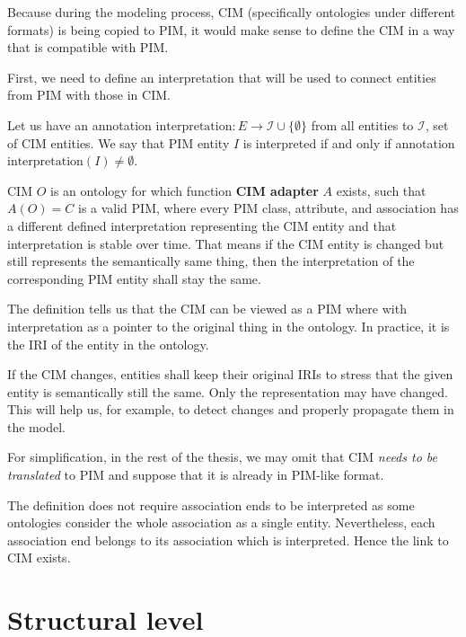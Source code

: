 Because during the modeling process, CIM (specifically ontologies under different formats) is being copied to PIM, it would make sense to define the CIM in a way that is compatible with PIM.

First, we need to define an interpretation that will be used to connect entities from PIM with those in CIM.

\begin{definition}[interpretation]
    Let us have an annotation $\textrm{interpretation}: E \rightarrow \mathcal{I} \cup \{\emptyset\}$ from all entities to $\mathcal{I}$, set of CIM entities. We say that PIM entity $I$ is interpreted if and only if annotation $\textrm{interpretation}(I) \neq \emptyset$.
\end{definition}

\begin{definition}[CIM]
    CIM $O$ is an ontology for which function \textbf{CIM adapter} $A$ exists, such that $A(O) = C$ is a valid PIM, where every PIM class, attribute, and association has a different defined interpretation representing the CIM entity and that interpretation is stable over time. That means if the CIM entity is changed but still represents the semantically same thing, then the interpretation of the corresponding PIM entity shall stay the same.
\end{definition}

The definition tells us that the CIM can be viewed as a PIM where with interpretation as a pointer to the original thing in the ontology. In practice, it is the IRI of the entity in the ontology.

If the CIM changes, entities shall keep their original IRIs to stress that the given entity is semantically still the same. Only the representation may have changed. This will help us, for example, to detect changes and properly propagate them in the model.

For simplification, in the rest of the thesis, we may omit that CIM \textit{needs to be translated} to PIM and suppose that it is already in PIM-like format.

The definition does not require association ends to be interpreted as some ontologies consider the whole association as a single entity. Nevertheless, each association end belongs to its association which is interpreted. Hence the link to CIM exists.

\section{Structural level}

